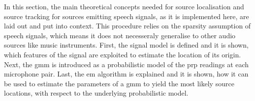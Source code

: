 In this section, the main theoretical concepts needed for source localisation and source tracking for sources emitting speech signals, as it is implemented here, are laid out and put into context. This procedure relies on the sparsity assumption of speech signals, which means it does not necesseraly generalise to other audio sources like music instruments. First, the signal model is defined and it is shown, which features of the signal are exploited to estimate the location of its origin. Next, the \gls{gmm} is introduced as a probabilistic model of the \gls{prp} readings at each microphone pair. Last, the \gls{em} algorithm is explained and it is shown, how it can be used to estimate the parameters of a \gls{gmm} to yield the most likely source locations, with respect to the underlying probabilistic model.